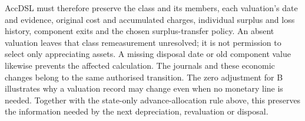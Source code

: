 AccDSL must therefore preserve the class and its members, each valuation's
date and evidence, original cost and accumulated charges, individual surplus
and loss history, component exits and the chosen surplus-transfer policy.
An absent valuation leaves that class remeasurement unresolved; it is not
permission to select only appreciating assets. A missing disposal date or
old component value likewise prevents the affected calculation. The journals
and these economic changes belong to the same authorised transition. The
zero adjustment for B illustrates why a valuation record may change even
when no monetary line is needed. Together with the state-only advance-allocation
rule above, this preserves the information needed
by the next depreciation, revaluation or disposal.
